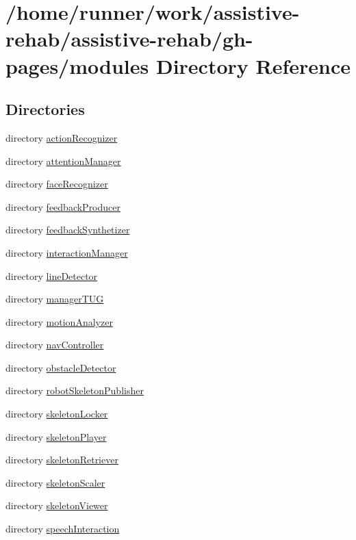 \section{/home/runner/work/assistive-\/rehab/assistive-\/rehab/gh-\/pages/modules Directory Reference}
\label{dir_e05d7e2b1ecd646af5bb94391405f3b5}
\subsection*{Directories}
\begin{DoxyCompactItemize}
\item 
directory \hyperlink{dir_7ee3331fa0268a1c262cd9cbdfaa2270}{action\+Recognizer}
\item 
directory \hyperlink{dir_a46a829c9ffa16e46d0a479a8cf947be}{attention\+Manager}
\item 
directory \hyperlink{dir_3f9f361010b3cb82c410f3e82d441f0f}{face\+Recognizer}
\item 
directory \hyperlink{dir_eb53649ee7c0d016bb4d0ffe2853685e}{feedback\+Producer}
\item 
directory \hyperlink{dir_a038ac0ec3ffe6af6669e585c468a820}{feedback\+Synthetizer}
\item 
directory \hyperlink{dir_43f189ed4c9d4d10d5414c952ee6763c}{interaction\+Manager}
\item 
directory \hyperlink{dir_ef396aeabc689f277fa0c177d341edef}{line\+Detector}
\item 
directory \hyperlink{dir_fa081b78cfedaeff997edb0a7ef43c6f}{manager\+T\+UG}
\item 
directory \hyperlink{dir_e74652c8acd73d6ffb9d13e855061106}{motion\+Analyzer}
\item 
directory \hyperlink{dir_66df65020ba08c75d6a49796cd595637}{nav\+Controller}
\item 
directory \hyperlink{dir_34d014d9c6fb5935244910860fcfd632}{obstacle\+Detector}
\item 
directory \hyperlink{dir_4d689b0a498683b7e47d4c62142a6334}{robot\+Skeleton\+Publisher}
\item 
directory \hyperlink{dir_fc89f880d046e41afdf54c874d22d6df}{skeleton\+Locker}
\item 
directory \hyperlink{dir_e46cd9cc8e4e6a312e18701ed5b451b0}{skeleton\+Player}
\item 
directory \hyperlink{dir_90e7bf13f67f50f41f53c60514f9fbdb}{skeleton\+Retriever}
\item 
directory \hyperlink{dir_d1d99c40a208ca3b44df605fb028a0dc}{skeleton\+Scaler}
\item 
directory \hyperlink{dir_076126b4aff66e1e9c0a8ac969ab5c2f}{skeleton\+Viewer}
\item 
directory \hyperlink{dir_1fc5b13c52ad4f09d6a8a4dc8f9d2c43}{speech\+Interaction}
\end{DoxyCompactItemize}
